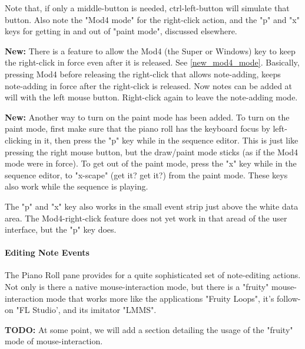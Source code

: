    Note that, if only a middle-button is needed, ctrl-left-button will simulate
   that button.  Also note the "Mod4 mode" for the right-click action, and the
   "p" and "x" keys for getting in and out of "paint mode", discussed
   elsewhere.

   \textbf{New:}
   There is a feature to allow the Mod4 (the Super or Windows) key to keep the
   right-click in force even after it is released.  See \ref{new_mod4_mode}.
   Basically, pressing Mod4 before releasing the right-click that allows
   note-adding, keeps note-adding in force after the right-click is released.
   Now notes can be added at will with the left mouse button.  Right-click
   again to leave the note-adding mode.

   \textbf{New:}
   Another way to turn on the paint mode has been added.
   To turn on the paint mode, first make sure that the piano roll has the
   keyboard focus by left-clicking in it, then press the
   "p" key while in the sequence editor.
   This is just like pressing the right mouse button, but the draw/paint mode
   sticks (as if the Mod4 mode were in force).
   To get out of the paint mode, press the
   "x" key while in the sequence editor, to "x-scape" (get it?  get it?)
   from the paint mode.
   These keys also work while the sequence is playing.

   The "p" and "x" key also works in the small event strip just
   above the white data area.  The Mod4-right-click feature does not
   yet work in that aread of the user interface, but the "p" key does.

\paragraph{Editing Note Events}
\label{paragraph:seq64_pattern_editor_note_events}

   The Piano Roll pane provides for a quite sophisticated set of note-editing
   actions.  Not only is there a native mouse-interaction mode, but there is
   a "fruity" mouse-interaction mode that works more like the applications
   "Fruity Loops", it's follow-on "FL Studio', and its imitator "LMMS".

   \setcounter{ItemCounter}{0}      %

   \textbf{TODO:}
   At some point, we will add a section detailing the usage of the "fruity"
   mode of mouse-interaction.

